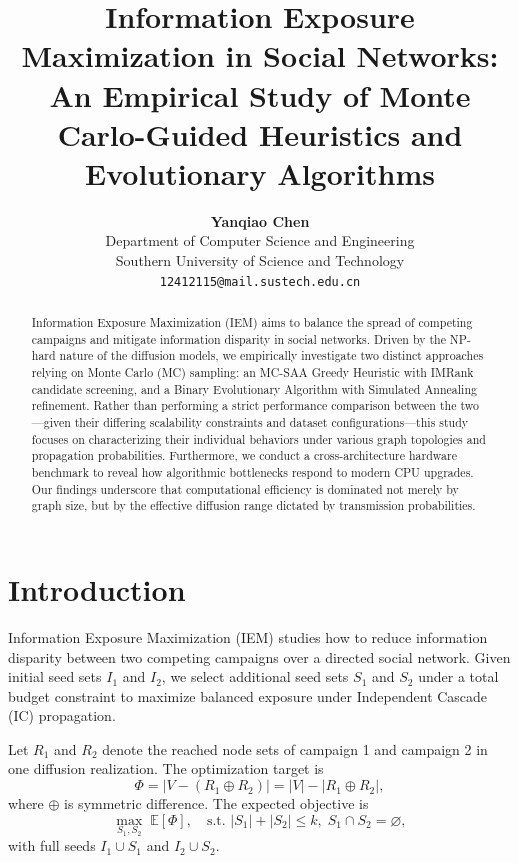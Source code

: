 \documentclass[onecolumn,a4paper,12pt]{IEEEtran}
\title{\textbf{Information Exposure Maximization in Social Networks: An Empirical Study of Monte Carlo-Guided Heuristics and Evolutionary Algorithms}}
\author{\textbf{Yanqiao Chen}\\
        Department of Computer Science and Engineering\\
        Southern University of Science and Technology\\
        \texttt{12412115@mail.sustech.edu.cn}}
\begin{document}
\maketitle

\begin{abstract}
Information Exposure Maximization (IEM) aims to balance the spread of competing campaigns and mitigate information disparity in social networks. Driven by the NP-hard nature of the diffusion models, we empirically investigate two distinct approaches relying on Monte Carlo (MC) sampling: an MC-SAA Greedy Heuristic with IMRank candidate screening, and a Binary Evolutionary Algorithm with Simulated Annealing refinement. Rather than performing a strict performance comparison between the two—given their differing scalability constraints and dataset configurations—this study focuses on characterizing their individual behaviors under various graph topologies and propagation probabilities. Furthermore, we conduct a cross-architecture hardware benchmark to reveal how algorithmic bottlenecks respond to modern CPU upgrades. Our findings underscore that computational efficiency is dominated not merely by graph size, but by the effective diffusion range dictated by transmission probabilities.
\end{abstract}

\section{Introduction}
Information Exposure Maximization (IEM) studies how to reduce information disparity between two competing campaigns over a directed social network. Given initial seed sets $I_1$ and $I_2$, we select additional seed sets $S_1$ and $S_2$ under a total budget constraint to maximize balanced exposure under Independent Cascade (IC) propagation.

Let $R_1$ and $R_2$ denote the reached node sets of campaign 1 and campaign 2 in one diffusion realization. The optimization target is
\begin{equation}
\Phi = \left|V - (R_1 \oplus R_2)\right| = |V| - |R_1 \oplus R_2|,
\end{equation}
where $\oplus$ is symmetric difference. The expected objective is
\begin{equation}
\max_{S_1,S_2} \; \mathbb{E}[\Phi],
\quad \text{s.t. } |S_1|+|S_2|\le k,\; S_1\cap S_2=\varnothing,
\end{equation}
with full seeds $I_1\cup S_1$ and $I_2\cup S_2$.
\end{document}
